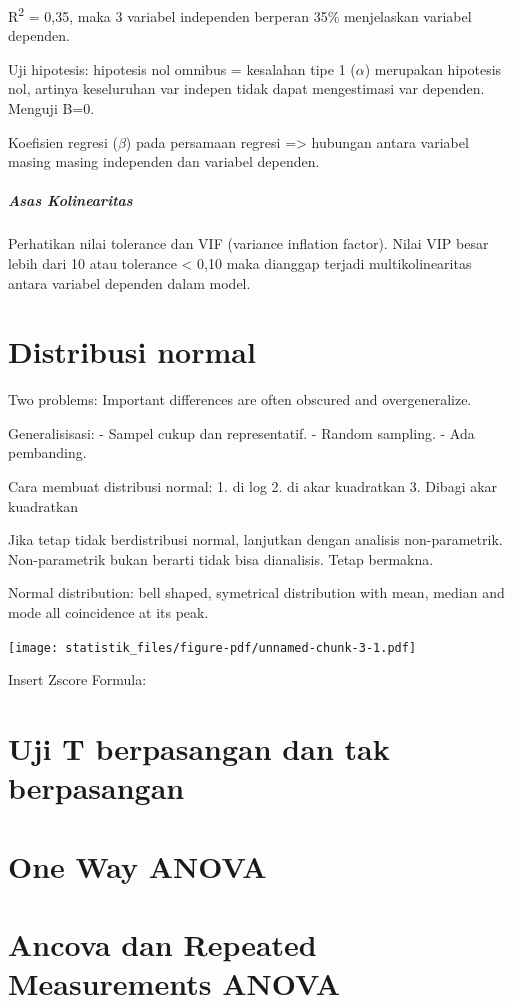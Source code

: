 \documentclass[
  letterpaper,
  DIV=11,
  numbers=noendperiod]{scrreprt}
\let\oldsubparagraph\subparagraph
\renewcommand{\subparagraph}[1]{\oldsubparagraph{#1}\mbox{}}
\begin{document}
R\textsuperscript{2} = 0,35, maka 3 variabel independen berperan 35\%
menjelaskan variabel dependen.

Uji hipotesis: hipotesis nol omnibus = kesalahan tipe 1 (\(\alpha\))
merupakan hipotesis nol, artinya keseluruhan var indepen tidak dapat
mengestimasi var dependen. Menguji B=0.

Koefisien regresi (\(\beta\)) pada persamaan regresi =\textgreater{}
hubungan antara variabel masing masing independen dan variabel dependen.

\subparagraph{Asas Kolinearitas}\label{asas-kolinearitas}

Perhatikan nilai tolerance dan VIF (variance inflation factor). Nilai
VIP besar lebih dari 10 atau tolerance \textless{} 0,10 maka dianggap
terjadi multikolinearitas antara variabel dependen dalam model.

\section{Distribusi normal}\label{distribusi-normal}

Two problems: Important differences are often obscured and
overgeneralize.

Generalisisasi: - Sampel cukup dan representatif. - Random sampling. -
Ada pembanding.

Cara membuat distribusi normal: 1. di log 2. di akar kuadratkan 3.
Dibagi akar kuadratkan

Jika tetap tidak berdistribusi normal, lanjutkan dengan analisis
non-parametrik. Non-parametrik bukan berarti tidak bisa dianalisis.
Tetap bermakna.

Normal distribution: bell shaped, symetrical distribution with mean,
median and mode all coincidence at its peak.

\texttt{[image: statistik\_files/figure-pdf/unnamed-chunk-3-1.pdf]}

Insert Zscore Formula:

\section{Uji T berpasangan dan tak
berpasangan}\label{uji-t-berpasangan-dan-tak-berpasangan}

\section{One Way ANOVA}\label{one-way-anova}

\section{Ancova dan Repeated Measurements
ANOVA}\label{ancova-dan-repeated-measurements-anova}
\end{document}
